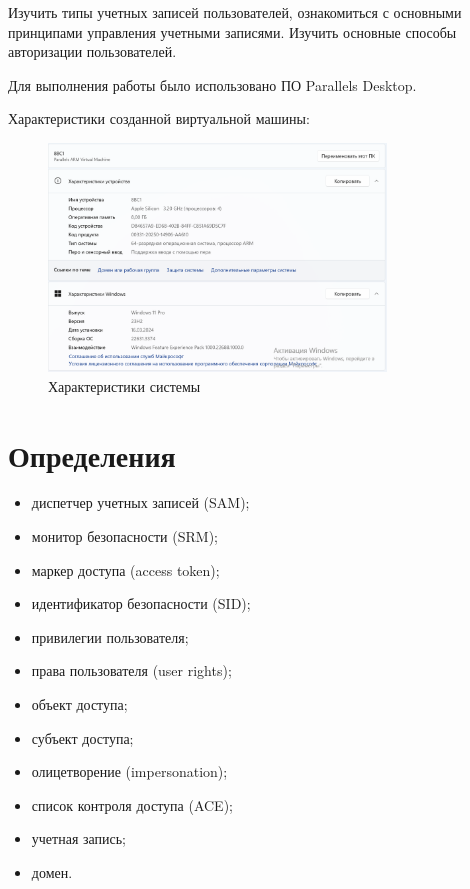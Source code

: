 \documentclass[a4paper, 14pt]{report}
\begin{document}
\setcounter{page}{2}
\tableofcontents
\newpage

Изучить типы учетных записей пользователей,
ознакомиться с основными принципами управления учетными записями.
Изучить основные способы авторизации пользователей.


Для выполнения работы было использовано ПО Parallels Desktop.

Характеристики созданной виртуальной машины:
\begin{figure}[h]
    \centering
    \includegraphics[width=0.8\textwidth]{../images/vm_specs.png}
    \caption{Характеристики системы}
\end{figure}
\section{Определения}
\begin{itemize}
    \item диспетчер учетных записей (SAM);
    \item монитор безопасности (SRM);
    \item маркер доступа (access token);
    \item идентификатор безопасности (SID);
    \item привилегии пользователя;
    \item права пользователя (user rights);
    \item объект доступа;
    \item субъект доступа;
    \item олицетворение (impersonation);
    \item список контроля доступа (ACE);
    \item учетная запись;
    \item домен.
\end{itemize}
\end{document}
